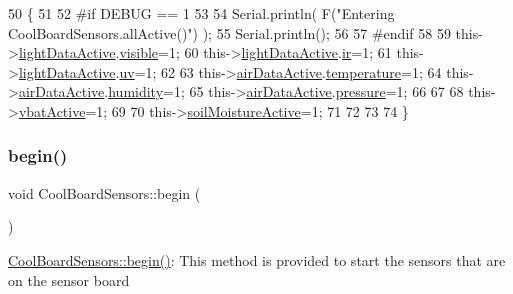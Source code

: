 \begin{DoxyCode}
50 \{
51 
52 \textcolor{preprocessor}{#if DEBUG == 1 }
53 
54     Serial.println( F(\textcolor{stringliteral}{"Entering CoolBoardSensors.allActive()"}) );
55     Serial.println();
56 
57 \textcolor{preprocessor}{#endif}
58     
59     this->\hyperlink{class_cool_board_sensors_ac4deb1cf41bac8b91c780c92fab00ba4}{lightDataActive}.\hyperlink{struct_cool_board_sensors_1_1light_active_a9c351100969d0dc055ad2e6712cc7ac8}{visible}=1;
60     this->\hyperlink{class_cool_board_sensors_ac4deb1cf41bac8b91c780c92fab00ba4}{lightDataActive}.\hyperlink{struct_cool_board_sensors_1_1light_active_a4c21258d3c89c6292740d6deb10f9dcc}{ir}=1;
61     this->\hyperlink{class_cool_board_sensors_ac4deb1cf41bac8b91c780c92fab00ba4}{lightDataActive}.\hyperlink{struct_cool_board_sensors_1_1light_active_a0e6cfc311425a31f32c32fc3b834ffb8}{uv}=1;    
62 
63     this->\hyperlink{class_cool_board_sensors_abff8dfeccb2f7689847bb64d5f1cd31e}{airDataActive}.\hyperlink{struct_cool_board_sensors_1_1air_active_ac08576736c7ac3bfbfec32e5ee17c686}{temperature}=1;
64     this->\hyperlink{class_cool_board_sensors_abff8dfeccb2f7689847bb64d5f1cd31e}{airDataActive}.\hyperlink{struct_cool_board_sensors_1_1air_active_ab69738e9fd1c2ba80dc666bcd1e116f7}{humidity}=1;
65     this->\hyperlink{class_cool_board_sensors_abff8dfeccb2f7689847bb64d5f1cd31e}{airDataActive}.\hyperlink{struct_cool_board_sensors_1_1air_active_a15932ccfb6ee6603713d937ec9b76b72}{pressure}=1;
66 
67 
68     this->\hyperlink{class_cool_board_sensors_ab0b4bbae83796b52b90f91008d383583}{vbatActive}=1;
69 
70     this->\hyperlink{class_cool_board_sensors_ae7971bf527781ac4994309591b78ab89}{soilMoistureActive}=1;
71     
72 
73 
74 \}
\end{DoxyCode}
\mbox{\label{class_cool_board_sensors_a97095823ef7c8f5290812f1405b966b3}} 
\subsubsection{\texorpdfstring{begin()}{begin()}}
{\footnotesize\ttfamily void Cool\+Board\+Sensors\+::begin (\begin{DoxyParamCaption}{ }\end{DoxyParamCaption})}

\hyperlink{class_cool_board_sensors_a97095823ef7c8f5290812f1405b966b3}{Cool\+Board\+Sensors\+::begin()}\+: This method is provided to start the sensors that are on the sensor board 

